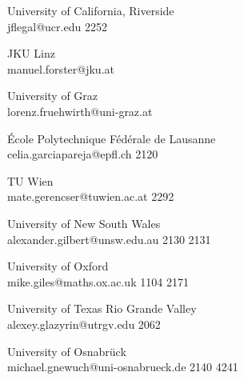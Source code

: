 \begin{multicols}{2}
 {University of California, Riverside\\}%
 {jflegal@ucr.edu}%
 {2252} %
 {} %
 {} %
 {} %
 {} %

 {JKU Linz\\}%
 {manuel.forster@jku.at}%
 {} %
 {} %
 {} %
 {} %
 {} %

 {University of Graz\\}%
 {lorenz.fruehwirth@uni-graz.at}%
 {} %
 {} %
 {} %
 {} %
 {} %

 {\'{E}cole Polytechnique F\'{e}d\'{e}rale de Lausanne\\}%
 {celia.garciapareja@epfl.ch}%
 {2120} %
 {} %
 {} %
 {} %
 {} %

 {TU Wien\\}%
 {mate.gerencser@tuwien.ac.at}%
 {2292} %
 {} %
 {} %
 {} %
 {} %

 {University of New South Wales\\}%
 {alexander.gilbert@unsw.edu.au}%
 {2130} %
 {2131} %
 {} %
 {} %
 {} %

 {University of Oxford\\}%
 {mike.giles@maths.ox.ac.uk}%
 {1104} %
 {2171} %
 {} %
 {} %
 {} %

 {University of Texas Rio Grande Valley\\}%
 {alexey.glazyrin@utrgv.edu}%
 {2062} %
 {} %
 {} %
 {} %
 {} %

 {University of Osnabr\"uck\\}%
 {michael.gnewuch@uni-osnabrueck.de}%
 {2140} %
 {4241} %
 {} %
 {} %
 {} %


\end{multicols}
